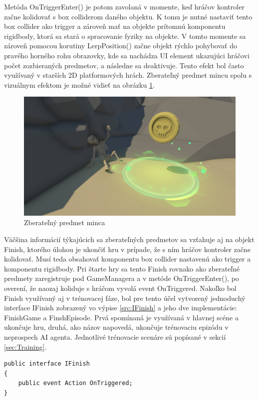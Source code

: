 \documentclass[slovak, master]{diploma}
\begin{document}
Metóda OnTriggerEnter() je potom zavolaná v momente, keď hráčov kontroler začne kolidovať s box colliderom daného objektu. K tomu je nutné nastaviť tento box collider ako trigger a zároveň mať na objekte prítomnú komponentu rigidbody, ktorá sa stará o spracovanie fyziky na objekte. V tomto momente sa zároveň pomocou korutiny LerpPosition() začne objekt rýchlo pohybovať do pravého horného rohu obrazovky, kde sa nachádza UI element ukazujúci hráčovi počet zozbieraných predmetov, a následne sa deaktivuje. Tento efekt bol často využívaný v starších 2D platformových hrách. Zberateľný predmet mincu spolu s vizuálnym efektom je možné vidieť na obrázku \ref{pic:Pickup}.

\begin{figure}[!htbp]
	\centering
	\includegraphics[width=.9\textwidth]{Figures/pickup.png}
	\caption{Zberateľný predmet minca}
	\label{pic:Pickup}
\end{figure}

Väčšina informácií týkajúcich sa zberateľných predmetov sa vzťahuje aj na objekt Finish, ktorého úlohou je ukončiť hru v prípade, že s ním hráčov kontroler začne kolidovať. Musí teda obsahovať komponentu box collider nastavenú ako trigger a komponentu rigidbody. Pri štarte hry sa tento Finish rovnako ako zberateľné predmety zaregistruje pod GameManagera a v metóde OnTriggerEnter(), po overení, že naozaj koliduje s hráčom vyvolá event OnTriggered. Nakoľko bol Finish využívaný aj v trénovacej fáze, bol pre tento účel vytvorený jednoduchý interface IFinish zobrazený vo výpise \ref{src:IFinish} a jeho dve implementácie: FinishGame a FinshEpisode. Prvá spomínaná je využívaná v hlavnej scéne a ukončuje hru, druhá, ako názov napovedá, ukončuje trénovaciu epizódu v neprospech AI agenta. Jednotlivé trénovacie scenáre sú popísané v sekcií \ref{sec:Training}.

\vspace{8pt}
\begin{lstlisting}[label=src:IFinish,caption={Interface IFinish}]
public interface IFinish
{
    public event Action OnTriggered;
}
\end{lstlisting}
\end{document}
